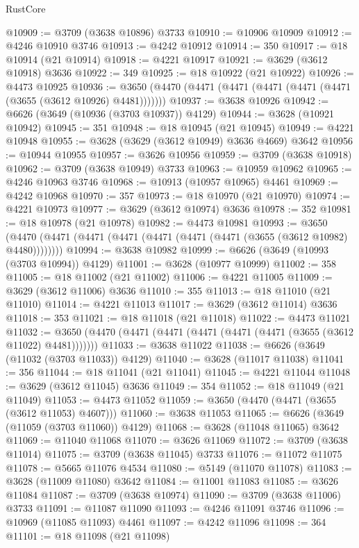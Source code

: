 \begin{lexlean}{RustCore}
\begin{coremodule}
@10909 := @3709 (@3638 @10896) @3733
@10910 := @10906 @10909
@10912 := @4246 @10910 @3746
@10913 := @4242 @10912
@10914 := 350
@10917 := @18 @10914 (@21 @10914)
@10918 := @4221 @10917
@10921 := @3629 (@3612 @10918) @3636
@10922 := 349
@10925 := @18 @10922 (@21 @10922)
@10926 := @4473 @10925
@10936 := @3650 (@4470 (@4471 (@4471 (@4471 (@4471 (@4471 (@3655 (@3612 @10926) @4481)))))))
@10937 := @3638 @10926
@10942 := @6626 (@3649 (@10936 (@3703 @10937)) @4129)
@10944 := @3628 (@10921 @10942)
@10945 := 351
@10948 := @18 @10945 (@21 @10945)
@10949 := @4221 @10948
@10955 := @3628 (@3629 (@3612 @10949) @3636 @4669) @3642
@10956 := @10944 @10955
@10957 := @3626 @10956
@10959 := @3709 (@3638 @10918)
@10962 := @3709 (@3638 @10949) @3733
@10963 := @10959 @10962
@10965 := @4246 @10963 @3746
@10968 := @10913 (@10957 @10965) @4461
@10969 := @4242 @10968
@10970 := 357
@10973 := @18 @10970 (@21 @10970)
@10974 := @4221 @10973
@10977 := @3629 (@3612 @10974) @3636
@10978 := 352
@10981 := @18 @10978 (@21 @10978)
@10982 := @4473 @10981
@10993 := @3650 (@4470 (@4471 (@4471 (@4471 (@4471 (@4471 (@4471 (@3655 (@3612 @10982) @4480))))))))
@10994 := @3638 @10982
@10999 := @6626 (@3649 (@10993 (@3703 @10994)) @4129)
@11001 := @3628 (@10977 @10999)
@11002 := 358
@11005 := @18 @11002 (@21 @11002)
@11006 := @4221 @11005
@11009 := @3629 (@3612 @11006) @3636
@11010 := 355
@11013 := @18 @11010 (@21 @11010)
@11014 := @4221 @11013
@11017 := @3629 (@3612 @11014) @3636
@11018 := 353
@11021 := @18 @11018 (@21 @11018)
@11022 := @4473 @11021
@11032 := @3650 (@4470 (@4471 (@4471 (@4471 (@4471 (@4471 (@3655 (@3612 @11022) @4481)))))))
@11033 := @3638 @11022
@11038 := @6626 (@3649 (@11032 (@3703 @11033)) @4129)
@11040 := @3628 (@11017 @11038)
@11041 := 356
@11044 := @18 @11041 (@21 @11041)
@11045 := @4221 @11044
@11048 := @3629 (@3612 @11045) @3636
@11049 := 354
@11052 := @18 @11049 (@21 @11049)
@11053 := @4473 @11052
@11059 := @3650 (@4470 (@4471 (@3655 (@3612 @11053) @4607)))
@11060 := @3638 @11053
@11065 := @6626 (@3649 (@11059 (@3703 @11060)) @4129)
@11068 := @3628 (@11048 @11065) @3642
@11069 := @11040 @11068
@11070 := @3626 @11069
@11072 := @3709 (@3638 @11014)
@11075 := @3709 (@3638 @11045) @3733
@11076 := @11072 @11075
@11078 := @5665 @11076 @4534
@11080 := @5149 (@11070 @11078)
@11083 := @3628 (@11009 @11080) @3642
@11084 := @11001 @11083
@11085 := @3626 @11084
@11087 := @3709 (@3638 @10974)
@11090 := @3709 (@3638 @11006) @3733
@11091 := @11087 @11090
@11093 := @4246 @11091 @3746
@11096 := @10969 (@11085 @11093) @4461
@11097 := @4242 @11096
@11098 := 364
@11101 := @18 @11098 (@21 @11098)

\end{coremodule}
\end{lexlean}
